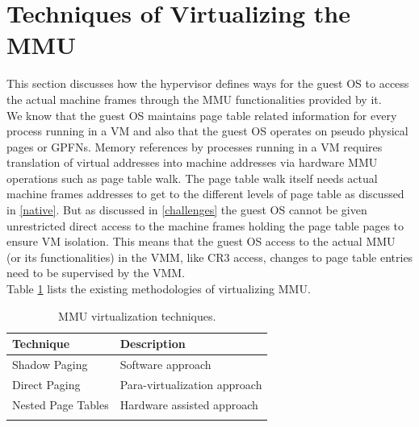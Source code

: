 \section{Techniques of Virtualizing the MMU} \label{techniques}
This section discusses how the hypervisor defines ways for the guest OS to access the actual
machine frames through the MMU functionalities provided by it.\\
We know that the guest OS maintains page table related information for every process running in a
VM and also that the guest OS operates on pseudo physical pages or GPFNs. Memory references by
processes running in a VM  requires translation of virtual addresses into machine addresses via
hardware MMU operations such as page table walk. The page table walk itself needs actual machine
frames addresses to get to the different levels of page table as discussed in \ref{native}. But as
discussed in \ref{challenges} the guest OS cannot be given unrestricted direct access to the
machine frames holding the page table pages to ensure VM isolation. This means that the guest OS
access to the actual MMU (or its functionalities) in the VMM, like CR3 access, changes to page
table entries need to be supervised by the VMM.\\
Table \ref{tab:tech} lists the existing methodologies of virtualizing MMU.
\begin{table}[tbp]
  \begin{center}
    \caption{MMU virtualization techniques.}
    \label{tab:tech}
    \begin{tabular}{ll}
      \toprule 
      Technique & Description \\
      \midrule
      Shadow Paging & Software approach\\
      Direct Paging &  Para-virtualization approach\\
      Nested Page Tables & Hardware assisted approach\\
      \bottomrule \\
    \end{tabular}
  \end{center}
\end{table}
